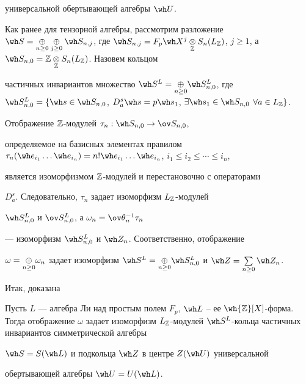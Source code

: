 универсальной обертывающей алгебры $\wh U$. 


 


Как ранее для тензорной алгебры, рассмотрим разложение $\wh 


S=\down{n\ge0}{\oplus}\down{j\ge0}{\oplus}\wh S_{n,j}$, где $\wh 


S_{n,j}=F_p\wh X^j\down{\Bbb Z}{\otimes}S_n(L_{\Bbb Z})$, $j\ge1$, а $\wh 


S_{n,0}=\Bbb Z\down{\Bbb Z}{\otimes}S_n(L_{\Bbb Z})$. Назовем кольцом 


частичных инвариантов множество $\wh S^L=\down{n\ge0}{\oplus}\wh 


S^L_{n,0}$, где $\wh S^L_{n,0}=\{\wh s\in\wh S_{n,0}$, $D^s_a\wh s=p\wh 


s_1$, $\exists\wh s_1\in\wh S_{n,0}$ $\forall a\in L_{\Bbb Z}\}$. 


 


Отображение $\Bbb Z$-модулей $\tau_n:\wh S_{n,0}\to\ov S_{n,0}$, 


определяемое на базисных элементах правилом $\tau_n(\wh e_{i_1}\dotsc\wh 


e_{i_n})=n!\wh e_{i_1}\dotsc\wh e_{i_n}$, $i_1\le i_2\le\dotsb\le i_n$, 


является изоморфизмом $\Bbb Z$-модулей и перестановочно с операторами 


$D^s_a$. Следовательно, $\tau_n$ задает изоморфизм $L_{\Bbb Z}$-модулей 


$\wh S^L_{n,0}$ и $\ov S^L_{n,0}$, а $\omega_n=\ov\theta^{-1}_n\tau_n$ 


--- изоморфизм $\wh S^L_{n,0}$ и $\wh Z_n$. Соответственно, отображение 


$\omega=\down{n\ge0}{\oplus}\omega_n$ задает изоморфизм $\wh 


S^L=\down{n\ge0}{\oplus}\wh S^L_{n,0}$ и $\wh Z=\sum\limits_{n\ge0}\wh 


Z_n$.  


 


Итак, доказана 


 


\begin{thm} 


Пусть $L$ --- алгебра Ли над простым полем $F_p$, $\wh L$ -- ее $\wh{\Bbb 


Z}[X]$-форма. Тогда отображение $\omega$ задает изоморфизм $L_{\Bbb 


Z}$-модулей $\wh S^L$-кольца частичных инвариантов симметрической алгебры 


$\wh S=S(\wh L)$ и подкольца $\wh Z$ в центре $Z(\wh U)$ универсальной 


обертывающей алгебры $\wh U=U(\wh L)$. 


\end{thm} 


